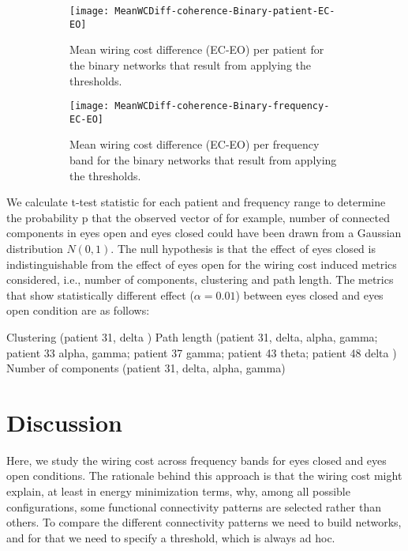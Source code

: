 \documentclass[11pt, onecolumn]{article}
\begin{document}
\begin{figure}[ht] 
  \begin{subfigure}[t]{0.5\linewidth}
    \centering
    \texttt{[image: MeanWCDiff-coherence-Binary-patient-EC-EO]} 
    \caption{Mean wiring cost difference (EC-EO) per patient for the binary networks that result from applying the thresholds.} 
    \label{binarymeanwcindivpatsmeans:a} 
    \vspace{4ex}
  \end{subfigure}%
  \hspace{1ex}
  \begin{subfigure}[t]{0.5\linewidth}
    \centering
    \texttt{[image: MeanWCDiff-coherence-Binary-frequency-EC-EO]} 
    \caption{Mean wiring cost difference (EC-EO) per frequency band for the binary networks that result from applying the thresholds.}
    \label{binarymeanwcindivpatsmeans:b} 
    \vspace{4ex}
  \end{subfigure} 
  \caption{}
  \label{fig:binarymeanwcindivpatsmeans} 
\end{figure}

We calculate t-test statistic for each patient and frequency range to determine the probability p that the observed vector of for example, number of connected components in eyes open and eyes closed could have been drawn from a Gaussian distribution $N(0,1)$.
The null hypothesis is that the effect of eyes closed is indistinguishable from the effect of eyes open for the wiring cost induced metrics considered, i.e., number of components, clustering and path length. 
The metrics that show statistically different effect ($\alpha = 0.01$) between eyes closed and eyes open condition are as follows:

Clustering (patient 31, delta )
Path length (patient 31, delta, alpha, gamma; patient 33 alpha, gamma; patient 37 gamma; patient 43 theta; patient 48 delta )
Number of components (patient 31, delta, alpha, gamma)



\section{Discussion}
Here, we study the wiring cost across frequency bands for eyes closed and eyes open conditions. The rationale behind this approach is that the wiring cost might explain, at least in energy minimization terms, why, among all possible configurations, some functional connectivity patterns are selected rather than others. 
To compare the different connectivity patterns we need to build networks, and for that we need to specify a threshold, which is always ad hoc.
\end{document}
